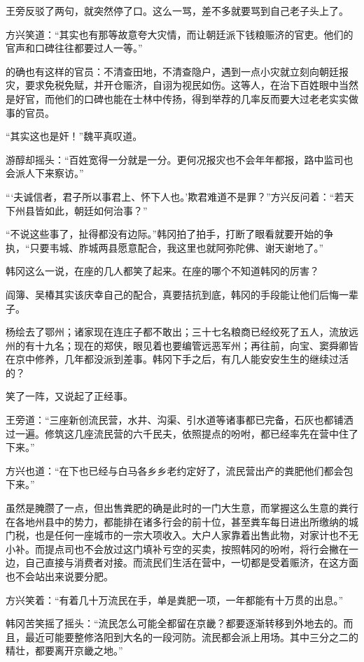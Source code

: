 王旁反驳了两句，就突然停了口。这么一骂，差不多就要骂到自己老子头上了。

方兴笑道：“其实也有那等故意夸大灾情，而让朝廷派下钱粮赈济的官吏。他们的官声和口碑往往都要过人一等。”

的确也有这样的官员：不清查田地，不清查隐户，遇到一点小灾就立刻向朝廷报灾，要求免税免赋，并开仓赈济，自诩为视民如伤。这等人，在治下百姓眼中当然是好官，而他们的口碑也能在士林中传扬，得到举荐的几率反而要大过老老实实做事的官员。

“其实这也是奸！”魏平真叹道。

游醇却摇头：“百姓宽得一分就是一分。更何况报灾也不会年年都报，路中监司也会派人下来察访。”

“‘夫诚信者，君子所以事君上、怀下人也。’欺君难道不是罪？”方兴反问着：“若天下州县皆如此，朝廷如何治事？”

“不说这些事了，扯得都没有边际。”韩冈拍了拍手，打断了眼看就要开始的争执，“只要韦城、胙城两县愿意配合，我这里也就阿弥陀佛、谢天谢地了。”

韩冈这么一说，在座的几人都笑了起来。在座的哪个不知道韩冈的厉害？

阎簿、吴椿其实该庆幸自己的配合，真要拮抗到底，韩冈的手段能让他们后悔一辈子。

杨绘去了鄂州；诸家现在连庄子都不敢出；三十七名粮商已经绞死了五人，流放远州的有十九名；现在的郑侠，眼见着也要编管远恶军州；再往前，向宝、窦舜卿皆在京中修养，几年都没派到差事。韩冈下手之后，有几人能安安生生的继续过活的？

笑了一阵，又说起了正经事。

王旁道：“三座新创流民营，水井、沟渠、引水道等诸事都已完备，石灰也都铺洒过一遍。修筑这几座流民营的六千民夫，依照提点的吩咐，都已经率先在营中住了下来。”

方兴也道：“在下也已经与白马各乡乡老约定好了，流民营出产的粪肥他们都会包下来。”

虽然是腌臜了一点，但出售粪肥的确是此时的一门大生意，而掌握这么生意的粪行在各地州县中的势力，都能排在诸多行会的前十位，甚至粪车每日进出所缴纳的城门税，也是任何一座城市的一宗大项收入。大户人家靠着出售此物，对家计也不无小补。而提点司也不会放过这门填补亏空的买卖，按照韩冈的吩咐，将行会撇在一边，自己直接与消费者对接。而流民们生活在营中，一切都是受着赈济，在这方面也不会站出来说要分肥。

方兴笑着：“有着几十万流民在手，单是粪肥一项，一年都能有十万贯的出息。”

韩冈苦笑摇了摇头：“流民怎么可能全都留在京畿？都要逐渐转移到外地去的。而且，最近可能要整修洛阳到大名的一段河防。流民都会派上用场。其中三分之二的精壮，都要离开京畿之地。”

